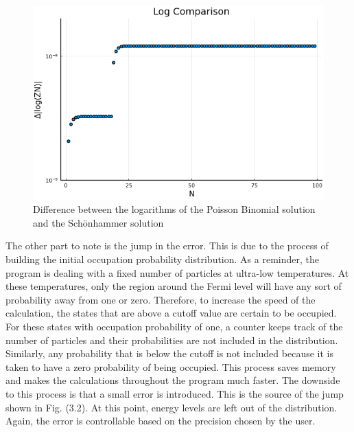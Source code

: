\begin{figure}[H]
    \includegraphics[scale=0.75]{figures/pdf/Benchdiff.png}
    \caption{Difference between the logarithms of the Poisson Binomial solution and the Sch\"onhammer solution}
\end{figure}

The other part to note is the jump in the error. This is due to the process of building the initial occupation probability distribution. As a reminder, the program is dealing with a fixed number of particles at ultra-low temperatures. At these temperatures, only the region around the Fermi level will have any sort of probability away from one or zero. Therefore, to increase the speed of the calculation, the states that are above a cutoff value are certain to be occupied. For these states with occupation probability of one, a counter keeps track of the number of particles and their probabilities are not included in the distribution. Similarly, any probability that is below the cutoff is not included because it is taken to have a zero probability of being occupied. This process saves memory and makes the calculations throughout the program much faster. The downside to this process is that a small error is introduced. This is the source of the jump shown in Fig. (3.2). At this point, energy levels are left out of the distribution. Again, the error is controllable based on the precision chosen by the user.

